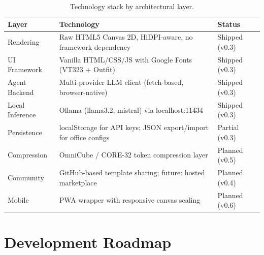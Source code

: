 \documentclass[11pt,letterpaper]{article}
\begin{document}
\begin{table}[H]
\centering
\small
\begin{tabularx}{\textwidth}{lXl}
\toprule
\textbf{Layer} & \textbf{Technology} & \textbf{Status} \\
\midrule
Rendering       & Raw HTML5 Canvas 2D, HiDPI-aware, no framework dependency          & Shipped (v0.3) \\
UI Framework    & Vanilla HTML/CSS/JS with Google Fonts (VT323 + Outfit)              & Shipped (v0.3) \\
Agent Backend   & Multi-provider LLM client (fetch-based, browser-native)            & Shipped (v0.3) \\
Local Inference & Ollama (llama3.2, mistral) via localhost:11434                      & Shipped (v0.3) \\
Persistence     & localStorage for API keys; JSON export/import for office configs   & Partial (v0.3) \\
Compression     & OmniCube / CORE-32 token compression layer                         & Planned (v0.5) \\
Community       & GitHub-based template sharing; future: hosted marketplace           & Planned (v0.4) \\
Mobile          & PWA wrapper with responsive canvas scaling                          & Planned (v0.6) \\
\bottomrule
\end{tabularx}
\caption{Technology stack by architectural layer.}
\end{table}


\section{Development Roadmap}
\end{document}
